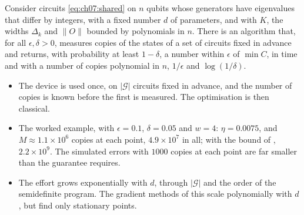\documentclass[handoutsbeamer.tex]{subfiles}
\begin{document}
\begin{frame}
\onp{\footnotesize}
\begin{thm}\label{thm:ch07:fpras}
Consider circuits \eqref{eq:ch07:shared} on $n$ qubits whose generators have eigenvalues that differ by integers, with a fixed number $d$ of parameters, and with $K$, the widths $\Delta_k$ and $\|O\|$ bounded by polynomials in $n$. There is an algorithm that, for all $\epsilon,\delta>0$, measures copies of the states of a set of circuits fixed in advance and returns, with probability at least $1-\delta$, a number within $\epsilon$ of $\min C$, in time and with a number of copies polynomial in $n$, $1/\epsilon$ and $\log(1/\delta)$.
\end{thm}
\begin{itemize}\setlength\itemsep{0.2em}
    \item The device is used once, on $|\mathcal G|$ circuits fixed in advance, and the number of copies is known before the first is measured. The optimisation is then classical.
    \item The worked example, with $\epsilon = 0.1$, $\delta = 0.05$ and $w = 4$: $\eta = 0.0075$, and $M\approx1.1\times10^6$ copies at each point, $4.9\times10^7$ in all; with the bound of \citet{sakos2026global}, $2.2\times10^9$. The simulated errors with $1000$ copies at each point are far smaller than the guarantee requires.
    \item The effort grows exponentially with $d$, through $|\mathcal G|$ and the order of the semidefinite program. The gradient methods of this \chap{} scale polynomially with $d$, but find only stationary points.
\end{itemize}
\end{frame}
\end{document}
